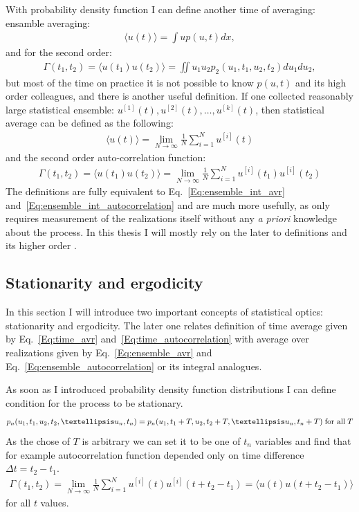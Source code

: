     With probability density function I can define another time of averaging: ensamble averaging:
    \begin{align}
        \langle u(t) \rangle = \int u p(u, t) dx,
        \label{Eq:ensemble_int_avr}
    \end{align}
    and for the second order:
    \begin{align}
        \Gamma(t_1, t_2) = \langle u(t_1)u(t_2) \rangle = \iint u_1u_2 p_2(u_1, t_1, u_2, t_2) du_1du_2,
        \label{Eq:ensemble_int_autocorrelation}
    \end{align}
    but most of the time on practice it is not possible to know $p(u, t)$ and its high order colleagues, and there is another useful definition. If one collected reasonably large statistical ensemble: $u^{[1]}(t), u^{[2]}(t), …, u^{[k]}(t)$, then statistical average can be defined as the following:
    \begin{align}
        \langle u(t) \rangle = \lim_{N\to\infty} \frac{1}{N}\sum_{i=1}^{N} u^{[i]}(t)
        \label{Eq:ensemble_avr}
    \end{align}
    and the second order auto-correlation function:
    \begin{align}
        \Gamma(t_1, t_2) = \langle u(t_1)u(t_2) \rangle = \lim_{N\to\infty} \frac{1}{N}\sum_{i=1}^{N} u^{[i]}(t_1)u^{[i]}(t_2)
        \label{Eq:ensemble_autocorrelation}
    \end{align}
    The definitions are fully equivalent to Eq.~\ref{Eq:ensemble_int_avr} and~\ref{Eq:ensemble_int_autocorrelation} and are much more usefully, as only requires measurement of the realizations itself without any \textit{a priori} knowledge about the process. In this thesis I will mostly rely on the later to definitions and its higher order .
    
    \subsection{Stationarity and ergodicity}
    In this section I will introduce two important concepts of statistical optics: stationarity and ergodicity. The later one relates definition of time average given by Eq.~\ref{Eq:time_avr} and~\ref{Eq:time_autocorrelation} with average over realizations given by Eq.~\ref{Eq:ensemble_avr} and Eq.~\ref{Eq:ensemble_autocorrelation} or its integral analogues. 
    
    As soon as I introduced probability density function distributions I can define condition for the process to be stationary.
    \begin{align}
        p_n(u_1, t_1, u_2, t_2, …u_n, t_n) = p_n(u_1, t_1 + T, u_2, t_2 + T, …u_n, t_n + T) \; \textup{for all} \; T
        \label{Eq:stationary_strict}
    \end{align}
    As the chose of $T$ is arbitrary we can set it to be one of $t_n$ variables and find that for example autocorrelation function depended only on time difference  $\Delta t = t_2 - t_1$.
    \begin{align}
        \Gamma(t_1, t_2) = \lim_{N\to\infty} \frac{1}{N}\sum_{i=1}^{N} u^{[i]}(t)u^{[i]}(t + t_2 - t_1) = \langle u(t)u(t + t_2 - t_1) \rangle
    \end{align}
    for all $t$ values.
    
